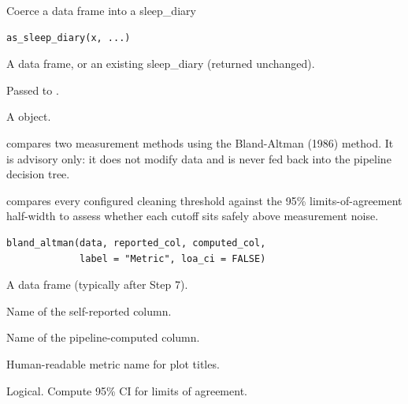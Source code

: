 \documentclass[a4paper]{book}
\begin{document}
%
\begin{Description}
Coerce a data frame into a sleep\_diary
\end{Description}
%
\begin{Usage}
\begin{verbatim}
as_sleep_diary(x, ...)
\end{verbatim}
\end{Usage}
%
\begin{Arguments}
\begin{ldescription}
\item[\code{x}] A data frame, or an existing sleep\_diary (returned unchanged).

\item[\code{...}] Passed to .
\end{ldescription}
\end{Arguments}
%
\begin{Value}
A  object.
\end{Value}
%
\begin{Description}
 compares two measurement methods using the
Bland-Altman (1986) method.  It is advisory only: it does not modify
data and is never fed back into the pipeline decision tree.

 compares every configured cleaning
threshold against the 95\% limits-of-agreement half-width to assess
whether each cutoff sits safely above measurement noise.
\end{Description}
%
\begin{Usage}
\begin{verbatim}
bland_altman(data, reported_col, computed_col,
             label = "Metric", loa_ci = FALSE)
\end{verbatim}
\end{Usage}
%
\begin{Arguments}
\begin{ldescription}
\item[\code{data}] A data frame (typically after Step 7).
\item[\code{reported\_col}] Name of the self-reported column.
\item[\code{computed\_col}] Name of the pipeline-computed column.
\item[\code{label}] Human-readable metric name for plot titles.
\item[\code{loa\_ci}] Logical. Compute 95\% CI for limits of agreement.
\end{ldescription}
\end{Arguments}
\end{document}
